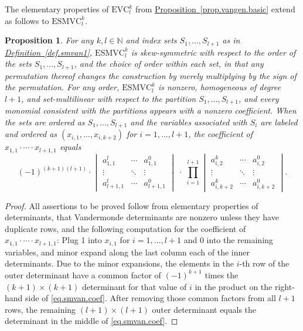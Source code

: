 \documentclass[11pt]{article}
\numberwithin{equation}{section}
\newtheorem{proposition}[theorem]{Proposition}
\theoremstyle{definition}
\theoremstyle{plain}
\newcommand{\N}{\mathbb N}
\newcommand{\expref}[2]{\hyperref[#2]{#1~\ref{#2}}}
\newcommand{\VanGen}{{\ensuremath{\mathrm{EVC}}}}
\newcommand{\VanGenparam}[2]{{\ensuremath{\VanGen^{#1}_{#2}}}}
\newcommand{\VanGenkl}{\VanGenparam{k}{l}}
\newcommand{\SMVanOne}{{\ensuremath{\mathrm{ESMVC}}}}
\newcommand{\SMVanOneparam}[2]{{\ensuremath{\SMVanOne^{#1}_{#2}}}}
\newcommand{\SMVanOnekl}{\SMVanOneparam{k}{l}}
\begin{document}
The elementary properties of $\VanGenkl$ from \expref{Proposition}{prop.vangen.basic} extend as follows to $\SMVanOnekl$.
\begin{proposition}
  \label{prop.smvan1-basic}
  For any \(k,l\in \N\) and index sets \(S_1,\ldots,S_{l+1}\) as in \expref{Definition}{def.smvan1}, 
  \(\SMVanOnekl\) is skew-symmetric with respect to the order of the sets
  \(S_1,\ldots,S_{l+1}\), and the choice of order within each set, in that any permutation thereof changes the construction by merely multiplying by the sign of the permutation. For any order,
  \(\SMVanOnekl\) is nonzero, homogeneous of degree
  \(l+1\), and set-multilinear with respect to the partition \(S_1, \dots, S_{l+1}\), and
  every monomial consistent with the partitions appears with a nonzero coefficient.
  When the sets are ordered as \(S_1,\ldots,S_{l+1}\)
  and the variables associated with $S_i$ are labeled and ordered as
  \((x_{i,1},\ldots,x_{i,k+2})\) for \(i=1,\ldots,l+1\),
  the coefficient of \(x_{1,1}\cdot\cdots\cdot x_{l+1,1}\)
  equals
  \begin{equation}\label{eq.smvan.coef} 
  (-1)^{(k+1)(l+1)} \cdot 
    \begin{vmatrix*}
      a_{1,1}^l & \cdots & a_{1,1}^0 \\
      \vdots & \ddots & \vdots \\
      a_{l+1,1}^l & \cdots & a_{l+1,1}^0
    \end{vmatrix*}
    \;\cdot\;
    \prod_{i=1}^{l+1}
      \begin{vmatrix*}
        a_{i,2}^k & \cdots & a_{i,2}^0 \\
        \vdots & \ddots & \vdots \\
        a_{i,k+2}^k & \cdots & a_{i,k+2}^0
      \end{vmatrix*}.
  \end{equation}
\end{proposition}
\begin{proof}
  All assertions to be proved follow from elementary properties of
  determinants, that Vandermonde determinants are nonzero unless they
  have duplicate rows, and the following computation for the coefficient of \(x_{1,1}\cdot\cdots\cdot x_{l+1,1}\):
  Plug 1 into \(x_{i,1}\) for \(i=1,\ldots,l+1\) and 0 into the
  remaining variables, and minor expand along the last column each of the inner determinants. Due to the minor expansions, the elements in the $i$-th row of the outer determinant have a common factor of $(-1)^{k+1}$ times the $(k+1) \times (k+1)$ determinant for that value of $i$ in the product on the right-hand side of \eqref{eq.smvan.coef}. After removing those common factors from all $l+1$ rows, the remaining $(l+1) \times (l+1)$ outer determinant equals the determinant in the middle of \eqref{eq.smvan.coef}.
\end{proof}
\end{document}
